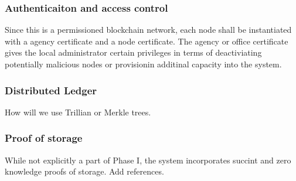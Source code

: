 \subsubsection{Authenticaiton and access control}

Since this is a permissioned blockchain network, each node shall be instantiated with a agency certificate and a node
certificate. The agency or office certificate gives the local administrator certain privileges in terms of deactiviating
potentially malicious nodes or provisionin additinal capacity into the system.

\subsubsection{Distributed Ledger}

How will we use Trillian or Merkle trees.
 
\subsubsection{Proof of storage}

While not explicitly a part of Phase I, the system incorporates succint and zero knowledge proofs of storage. Add
references.

